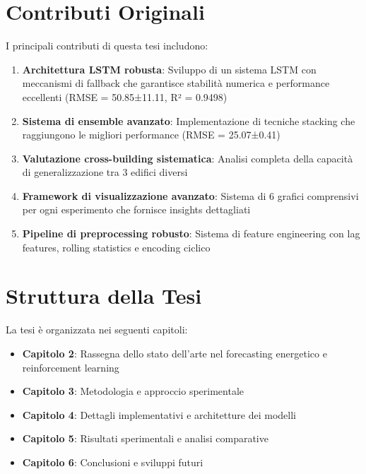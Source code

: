 \documentclass[12pt,a4paper,twoside]{report}
\begin{document}
\section{Contributi Originali}

I principali contributi di questa tesi includono:

\begin{enumerate}
    \item \textbf{Architettura LSTM robusta}: Sviluppo di un sistema LSTM con meccanismi di fallback che garantisce stabilità numerica e performance eccellenti (RMSE = 50.85±11.11, R² = 0.9498)
    
    \item \textbf{Sistema di ensemble avanzato}: Implementazione di tecniche stacking che raggiungono le migliori performance (RMSE = 25.07±0.41)
    
    \item \textbf{Valutazione cross-building sistematica}: Analisi completa della capacità di generalizzazione tra 3 edifici diversi
    
    \item \textbf{Framework di visualizzazione avanzato}: Sistema di 6 grafici comprensivi per ogni esperimento che fornisce insights dettagliati
    
    \item \textbf{Pipeline di preprocessing robusto}: Sistema di feature engineering con lag features, rolling statistics e encoding ciclico
\end{enumerate}

\section{Struttura della Tesi}

La tesi è organizzata nei seguenti capitoli:

\begin{itemize}
    \item \textbf{Capitolo 2}: Rassegna dello stato dell'arte nel forecasting energetico e reinforcement learning
    \item \textbf{Capitolo 3}: Metodologia e approccio sperimentale
    \item \textbf{Capitolo 4}: Dettagli implementativi e architetture dei modelli
    \item \textbf{Capitolo 5}: Risultati sperimentali e analisi comparative
    \item \textbf{Capitolo 6}: Conclusioni e sviluppi futuri
\end{itemize}
\end{document}
